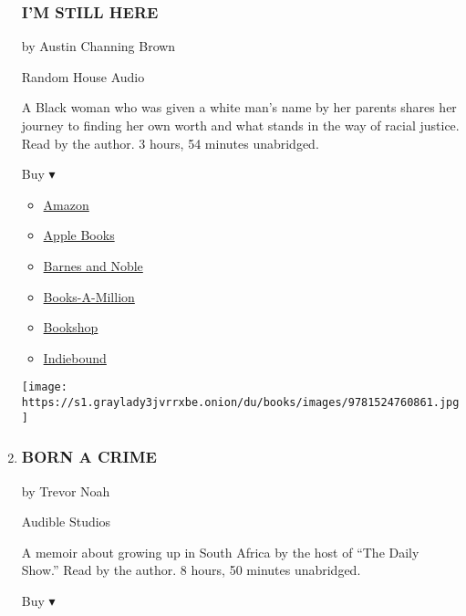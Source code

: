 \begin{enumerate}
{  \subsubsection{I'M STILL HERE}\label{im-still-here}}

  by Austin Channing Brown

  Random House Audio

  A Black woman who was given a white man's name by her parents shares
  her journey to finding her own worth and what stands in the way of
  racial justice. Read by the author. 3 hours, 54 minutes unabridged.

  Buy ▾

  \begin{itemize}
  \tightlist
  \item
    \href{https://www.amazon.com/dp/1524760854?tag=NYTBSREV-20\&tag=NYTBS-20}{Amazon}
  \item
    \href{https://du-gae-books-dot-nyt-du-prd.appspot.com/buy?title=I\%27M+STILL+HERE\&author=Austin+Channing+Brown}{Apple
    Books}
  \item
    \href{https://www.anrdoezrs.net/click-7990613-11819508?url=https\%3A\%2F\%2Fwww.barnesandnoble.com\%2Fw\%2F\%3Fean\%3D9780525588511}{Barnes
    and Noble}
  \item
    \href{https://www.anrdoezrs.net/click-7990613-35140?url=https\%3A\%2F\%2Fwww.booksamillion.com\%2Fp\%2FI\%2527M\%2BSTILL\%2BHERE\%2FAustin\%2BChanning\%2BBrown\%2F9780525588511}{Books-A-Million}
  \item
    \href{https://bookshop.org/a/3546/9780525588511}{Bookshop}
  \item
    \href{https://www.indiebound.org/book/9780525588511?aff=NYT}{Indiebound}
  \end{itemize}

  \texttt{[image: https://s1.graylady3jvrrxbe.onion/du/books/images/9781524760861.jpg]}
\item
  \hypertarget{born-a-crime}{%
  \subsubsection{BORN A CRIME}\label{born-a-crime}}

  by Trevor Noah

  Audible Studios

  A memoir about growing up in South Africa by the host of ``The Daily
  Show.'' Read by the author. 8 hours, 50 minutes unabridged.

  Buy ▾


\end{enumerate}
